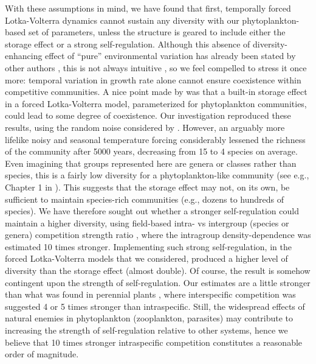\documentclass[a4paper,12pt]{article}
\begin{document}
With these assumptions in mind, we have found that first, temporally
forced Lotka-Volterra dynamics cannot sustain any diversity with our
phytoplankton-based set of parameters, unless the structure is geared
to include either the storage effect or a strong self-regulation. Although
this absence of diversity-enhancing effect of ``pure'' environmental
variation has already been stated by other authors \citep{chesson_roles_1997,barabas_community_2012,fox_intermediate_2013,scranton_coexistence_2016},
this is not always intuitive \citep{fox_intermediate_2013}, so we
feel compelled to stress it once more: temporal variation in growth
rate alone cannot ensure coexistence within competitive communities.
A nice point made by \citet{scranton_coexistence_2016} was that a
built-in storage effect in a forced Lotka-Volterra model, parameterized
for phytoplankton communities, could lead to some degree of coexistence.
Our investigation reproduced these results, using the random noise
considered by \citet{scranton_coexistence_2016}. However, an arguably
more lifelike noisy and seasonal temperature forcing considerably
lessened the richness of the community after 5000 years, decreasing
from 15 to 4 species on average. Even imagining that groups represented
here are genera or classes rather than species, this is a fairly low
diversity for a phytoplankton-like community (see e.g., Chapter 1
in \citealp{reynolds2006ecology}). This suggests that the storage
effect may not, on its own, be sufficient to maintain species-rich
communities (e.g., dozens to hundreds of species). We have therefore
sought out whether a stronger self-regulation could maintain a higher
diversity, using field-based intra- vs intergroup (species or genera)
competition strength ratio \citep{barraquand2018coastal}, where the
intragroup density-dependence was estimated 10 times stronger. Implementing
such strong self-regulation, in the forced Lotka-Volterra models that
we considered, produced a higher level of diversity than the storage
effect (almost double). Of course, the result is somehow contingent
upon the strength of self-regulation. Our estimates are a little stronger
than what was found in perennial plants \citep{adler_coexistence_2010},
where interspecific competition was suggested 4 or 5 times stronger
than intraspecific. Still, the widespread effects of natural enemies
in phytoplankton (zooplankton, parasites) may contribute to increasing
the strength of self-regulation \citep{barraquand2018coastal,chesson_updates_2018}
relative to other systems, hence we believe that 10 times stronger
intraspecific competition constitutes a reasonable order of magnitude. 
\end{document}
